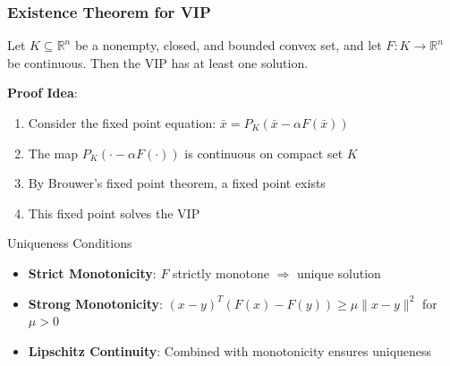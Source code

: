 \documentclass[aspectratio=169,10pt]{beamer}
\begin{document}
\begin{frame}
\frametitle{Existence Theorem for VIP}

\begin{theorem}
Let $K \subseteq \mathbb{R}^n$ be a nonempty, closed, and bounded convex set,
and let $F : K \to \mathbb{R}^n$ be continuous.
Then the VIP has at least one solution.
\end{theorem}

\vspace{0.3cm}

\textbf{Proof Idea}:
\begin{enumerate}
    \item Consider the fixed point equation: $\bar{x} = P_K(\bar{x} - \alpha F(\bar{x}))$
    \item The map $P_K(\cdot - \alpha F(\cdot))$ is continuous on compact set $K$
    \item By Brouwer's fixed point theorem, a fixed point exists
    \item This fixed point solves the VIP
\end{enumerate}

\vspace{0.3cm}

\begin{block}{Uniqueness Conditions}
\begin{itemize}
    \item \textbf{Strict Monotonicity}: $F$ strictly monotone $\Rightarrow$ unique solution
    \item \textbf{Strong Monotonicity}: $(x-y)^T(F(x)-F(y)) \geq \mu\|x-y\|^2$ for $\mu > 0$
    \item \textbf{Lipschitz Continuity}: Combined with monotonicity ensures uniqueness
\end{itemize}
\end{block}

\end{frame}
\end{document}
